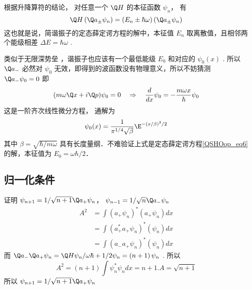 根据升降算符的结论，%
对任意一个 $\Q H$ 的本征函数 ${\psi_n}$， 有
\begin{equation}
  \Q H\left( {{{\Q a}_ \pm }{\psi_n}} \right) = \left( {{E_n} \pm \hbar \omega } \right)\left( {{{\Q a}_ \pm }{\psi_n}} \right)
\end{equation}
这也就是说，简谐振子的定态薛定谔方程的解中，本征值 ${E_n}$ 取离散值，且相邻两个能级相差 $\Delta E = \hbar \omega $ . 

类似于无限深势垒%
，谐振子也应该有一个最低能级 ${E_0}$ 和对应的 ${\psi_0}\left( x \right)$ . 所以 ${\Q a_ - }$ 必然对 ${\psi_0}$ 无效，即得到的波函数没有物理意义，所以不妨猜测 ${\Q a_ - }{\psi_0} = 0$ 
即
\begin{equation}
(m\omega \Q x + i\Q p){\psi_0} = 0
\quad \Rightarrow \quad
\frac{d}{dx}{\psi_0} =  - \frac{m\omega x}{\hbar }{\psi_0}
\end{equation}
这是一阶齐次线性微分方程，%
通解为
\begin{equation}
{\psi_0}(x) = \frac{1}{{\pi ^{1/4}}\sqrt \beta  }{\E^{ - {{(x/\beta )}^2}/2}}
\end{equation}
其中 $\beta = \sqrt {\hbar /m\omega }$ 具有长度量纲．不难验证上式是定态薛定谔方程\autoref{QSHOop_eq6} 的解，本征值为 $E_0=\omega\hbar/2$．


\subsection{归一化条件}


证明 ${\psi_{n + 1}} = {1}/{{\sqrt {n + 1} }}{\Q a_ + }{\psi_n}$，  ${\psi_{n - 1}} = {1}/{{\sqrt n }}{\Q a_ - }{\psi_n}$ 
\begin{equation}
\begin{aligned}
  {A^2} & = \int {{{\left( {{a_ + }{\psi_n}} \right)}^*}\left( {{a_ + }{\psi_n}} \right)dx} \\
   & = \int {{{\left( {a_ + ^*{a_ + }{\psi_n}} \right)}^*}\left( {\psi_n} \right)dx}  \\
   & = \int {{{\left( {{a_ - }{a_ + }{\psi_n}} \right)}^*}\left( {\psi_n} \right)dx}
\end{aligned}
\end{equation}
而 ${\Q a_ - }{\Q a_ + }{\psi_n} = {{\Q H{\psi_n}}}/{{\omega \hbar }} + {1}/{2}{\psi_n} = \left( {n + 1} \right){\psi_n}$ . 所以
\begin{equation}
  {A^2} = \left( {n + 1} \right)\int {\psi_n^*{\psi_n}dx}  = n + 1. A = \sqrt {n + 1}
\end{equation}
所以 ${\psi_{n + 1}} = {1}/{{\sqrt {n + 1} }}{\Q a_ + }{\psi_n}$

